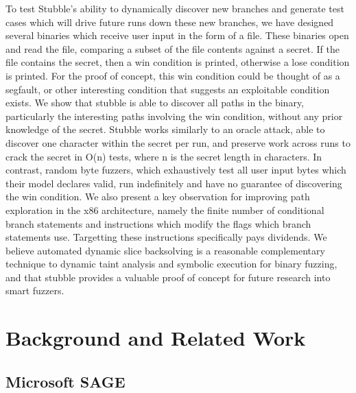 \documentclass[11pt,expanded,copyright]{fsuthesis}
\begin{document}
To test Stubble's ability to dynamically discover new branches and generate test cases which will drive future runs down these new branches, we have designed several binaries which receive user input in the form of a file. These binaries open and read the file, comparing a subset of the file contents against a secret. If the file contains the secret, then a win condition is printed, otherwise a lose condition is printed. For the proof of concept, this win condition could be thought of as a segfault, or other interesting condition that suggests an exploitable condition exists. We show that stubble is able to discover all paths in the binary, particularly the interesting paths involving the win condition, without any prior knowledge of the secret. Stubble works similarly to an oracle attack, able to discover one character within the secret per run, and preserve work across runs to crack the secret in O(n) tests, where n is the secret length in characters. In contrast, random byte fuzzers, which exhaustively test all user input bytes which their model declares valid, run indefinitely and have no guarantee of discovering the win condition. We also present a key observation for improving path exploration in the x86 architecture, namely the finite number of conditional branch statements and instructions which modify the flags which branch statements use. Targetting these instructions specifically pays dividends. We believe automated dynamic slice backsolving is a reasonable complementary technique to dynamic taint analysis and symbolic execution for binary fuzzing, and that stubble provides a valuable proof of concept for future research into smart fuzzers.

\chapter{Background and Related Work}




\section{Microsoft SAGE}
\end{document}
